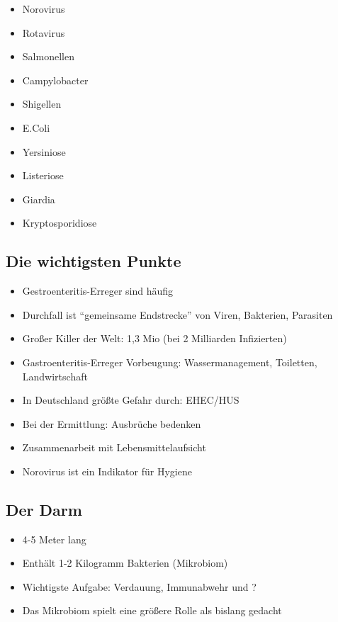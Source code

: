 \documentclass[
]{article}
\providecommand{\tightlist}{%
  \setlength{\itemsep}{0pt}\setlength{\parskip}{0pt}}
\begin{document}
\begin{itemize}
\tightlist
\item
  Norovirus
\item
  Rotavirus
\item
  Salmonellen
\item
  Campylobacter
\item
  Shigellen
\item
  E.Coli
\item
  Yersiniose
\item
  Listeriose
\item
  Giardia
\item
  Kryptosporidiose
\end{itemize}

\hypertarget{die-wichtigsten-punkte}{%
\subsection{Die wichtigsten Punkte}\label{die-wichtigsten-punkte}}

\begin{itemize}
\tightlist
\item
  Gestroenteritis-Erreger sind häufig
\item
  Durchfall ist ``gemeinsame Endstrecke'' von Viren, Bakterien,
  Parasiten
\item
  Großer Killer der Welt: 1,3 Mio (bei 2 Milliarden Infizierten)
\item
  Gastroenteritis-Erreger Vorbeugung: Wassermanagement, Toiletten,
  Landwirtschaft
\item
  In Deutschland größte Gefahr durch: EHEC/HUS
\item
  Bei der Ermittlung: Ausbrüche bedenken
\item
  Zusammenarbeit mit Lebensmittelaufsicht
\item
  Norovirus ist ein Indikator für Hygiene
\end{itemize}

\hypertarget{der-darm}{%
\subsection{Der Darm}\label{der-darm}}

\begin{itemize}
\tightlist
\item
  4-5 Meter lang
\item
  Enthält 1-2 Kilogramm Bakterien (Mikrobiom)
\item
  Wichtigste Aufgabe: Verdauung, Immunabwehr und ?
\item
  Das Mikrobiom spielt eine größere Rolle als bislang gedacht
\end{itemize}
\end{document}
